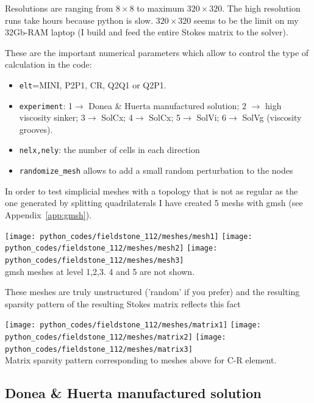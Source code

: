 Resolutions are ranging from $8\times 8$ to maximum $320\times320$. The high resolution runs take hours 
because python is slow. $320\times 320$ seems to be the limit on my 32Gb-RAM laptop (I build and feed 
the entire Stokes matrix to the solver).  

These are the important numerical parameters which allow to control the type of calculation in the code:
\begin{itemize}
\item {\tt elt}=MINI, P2P1, CR, Q2Q1 or Q2P1.
\item {\tt experiment}: 1$\rightarrow$ Donea \& Huerta manufactured solution;
2 $\rightarrow$ high viscosity sinker; 3$\rightarrow$ SolCx; 4$\rightarrow$ SolCx; 
5$\rightarrow$ SolVi; 6$\rightarrow$ SolVg (viscosity grooves).
\item {\tt nelx,nely}:  the number of cells in each direction
\item {\tt randomize\_mesh} allows to add a small random perturbation to the nodes
\end{itemize}

In order to test simplicial meshes with a topology that is not as regular as the one
generated by splitting quadrilaterals I have created 5 meshs with gmsh (see Appendix~\ref{app:gmsh}).

\begin{center}
\texttt{[image: python\_codes/fieldstone\_112/meshes/mesh1]}
\texttt{[image: python\_codes/fieldstone\_112/meshes/mesh2]}
\texttt{[image: python\_codes/fieldstone\_112/meshes/mesh3]}\\
{\captionfont gmsh meshes at level 1,2,3. 4 and 5 are not shown.}
\end{center}

These meshes are truly unstructured ('random' if you prefer) and 
the resulting sparsity pattern of the resulting Stokes matrix reflects this fact

\begin{center}
\texttt{[image: python\_codes/fieldstone\_112/meshes/matrix1]}
\texttt{[image: python\_codes/fieldstone\_112/meshes/matrix2]}
\texttt{[image: python\_codes/fieldstone\_112/meshes/matrix3]}\\
{\captionfont Matrix sparsity pattern corresponding to meshes above for C-R element.}
\end{center}



\newpage
\subsection*{Donea \& Huerta manufactured solution}

